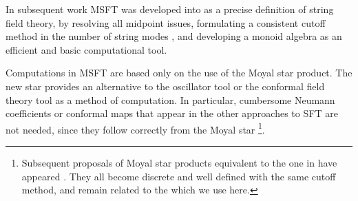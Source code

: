 \documentclass[a4paper,11pt]{article}
\begin{document}
In subsequent work \cite{BM1, BM2} MSFT was developed into as a precise
definition of string field theory, by resolving all midpoint issues,
formulating a consistent cutoff method in the number of string modes \coordHE{},
and developing a monoid algebra as an efficient and basic computational tool.

Computations in MSFT are based only on the use of the Moyal star product.
The new star provides an alternative to the oscillator tool or the conformal
field theory tool as a method of computation. In particular, cumbersome
Neumann coefficients or conformal maps that appear in the other approaches
to SFT are not needed, since they follow correctly from the Moyal star \cite%
{BM2}\footnote{%
Subsequent proposals of Moyal star products equivalent to the one in \cite{B}
have appeared \cite{DLMZ}\cite{Moyal}\cite{moyalMoscow}. They all become
discrete and well defined with the same cutoff method, and remain related to
the \myHighlight{$\star $}\coordHE{} which we use here.}.
\end{document}
